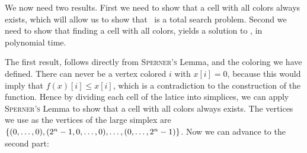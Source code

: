 We now need two results. First we need to show that a cell with all colors always exists, which will allow us to show that \Tarskistar\ is a total search problem. Second we need to show that finding a cell with all colors, yields a solution to \Tarskistar, in polynomial time.

The first result, follows directly from \textsc{Sperner's} Lemma, and the coloring we have defined. There can never be a vertex colored $i$ with $x[i] = 0$, because this would imply that $f(x)[i] \leq x[i]$, which is a contradiction to the construction of the function. Hence by dividing each cell of the latice into simplices, we can apply \textsc{Sperner's} Lemma to show that a cell with all colors always exists. The vertices we use as the vertices of the large simplex are $\left\{(0, \dots, 0), (2^n - 1, 0, \dots, 0), \dots, (0, \dots, 2^n - 1)\right\}$. Now we can advance to the second part:

